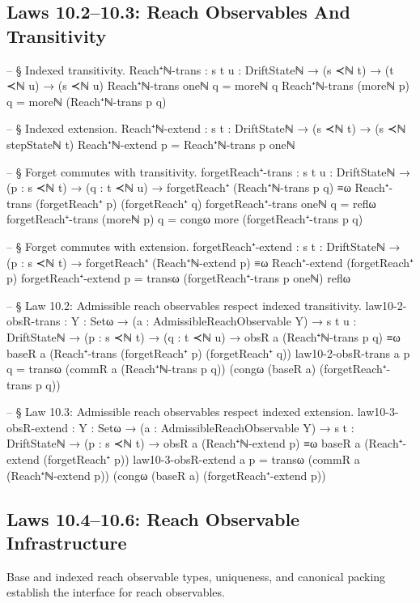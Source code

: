 \documentclass[11pt,a4paper]{book}
\begin{document}
\subsection{Laws 10.2--10.3: Reach Observables And Transitivity}

\begin{code}
-- § Indexed transitivity.
Reach⁺ℕ-trans : {s t u : DriftStateℕ} → (s ≺ℕ t) → (t ≺ℕ u) → (s ≺ℕ u)
Reach⁺ℕ-trans oneℕ      q = moreℕ q
Reach⁺ℕ-trans (moreℕ p) q = moreℕ (Reach⁺ℕ-trans p q)

-- § Indexed extension.
Reach⁺ℕ-extend : {s t : DriftStateℕ} → (s ≺ℕ t) → (s ≺ℕ stepStateℕ t)
Reach⁺ℕ-extend p = Reach⁺ℕ-trans p oneℕ

-- § Forget commutes with transitivity.
forgetReach⁺-trans :
  {s t u : DriftStateℕ} →
  (p : s ≺ℕ t) → (q : t ≺ℕ u) →
  forgetReach⁺ (Reach⁺ℕ-trans p q) ≡ω Reach⁺-trans (forgetReach⁺ p) (forgetReach⁺ q)
forgetReach⁺-trans oneℕ      q = reflω
forgetReach⁺-trans (moreℕ p) q = congω more (forgetReach⁺-trans p q)

-- § Forget commutes with extension.
forgetReach⁺-extend :
  {s t : DriftStateℕ} →
  (p : s ≺ℕ t) →
  forgetReach⁺ (Reach⁺ℕ-extend p) ≡ω Reach⁺-extend (forgetReach⁺ p)
forgetReach⁺-extend p =
  transω (forgetReach⁺-trans p oneℕ) reflω

-- § Law 10.2: Admissible reach observables respect indexed transitivity.
law10-2-obsR-trans :
  {Y : Setω} →
  (a : AdmissibleReachObservable Y) →
  {s t u : DriftStateℕ} →
  (p : s ≺ℕ t) → (q : t ≺ℕ u) →
  obsR a (Reach⁺ℕ-trans p q) ≡ω baseR a (Reach⁺-trans (forgetReach⁺ p) (forgetReach⁺ q))
law10-2-obsR-trans a p q =
  transω (commR a (Reach⁺ℕ-trans p q)) (congω (baseR a) (forgetReach⁺-trans p q))

-- § Law 10.3: Admissible reach observables respect indexed extension.
law10-3-obsR-extend :
  {Y : Setω} →
  (a : AdmissibleReachObservable Y) →
  {s t : DriftStateℕ} →
  (p : s ≺ℕ t) →
  obsR a (Reach⁺ℕ-extend p) ≡ω baseR a (Reach⁺-extend (forgetReach⁺ p))
law10-3-obsR-extend a p =
  transω (commR a (Reach⁺ℕ-extend p)) (congω (baseR a) (forgetReach⁺-extend p))
\end{code}

\subsection{Laws 10.4--10.6: Reach Observable Infrastructure}

Base and indexed reach observable types, uniqueness, and canonical packing establish the interface for reach observables.
\end{document}
